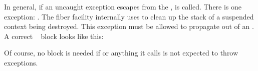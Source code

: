 \label{exceptions}

In general, if an uncaught exception escapes from the \entryfn,
 is called. There is one exception: \unwindex. The fiber
facility internally uses \unwindex to clean up the stack of a suspended context
being destroyed. This exception must be allowed to propagate out of an \entryfn.\\

A correct \entryfn\  block looks like this:

Of course, no  block is needed if \entryfn\xspace or anything it
calls is not expected to throw exceptions.
